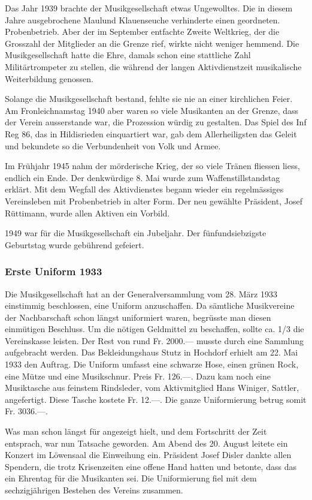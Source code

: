 \begin{history}
    Das Jahr 1939 brachte der Musikgesellschaft etwas Ungewolltes. Die in diesem
    Jahre ausgebrochene Maulund Klauenseuche verhinderte einen geordneten.
    Probenbetrieb. Aber der im September entfachte Zweite Weltkrieg, der die
    Grosszahl der Mitglieder an die Grenze rief, wirkte nicht weniger hemmend.
    Die Musikgesellschaft hatte die Ehre, damals schon eine stattliche Zahl
    Militärtrompeter zu stellen, die während der langen Aktivdienstzeit
    musikalische Weiterbildung genossen.

    Solange die Musikgesellschaft bestand, fehlte sie nie an einer kirchlichen
    Feier. Am Fronleichnamstag 1940 aber waren so viele Musikanten an der
    Grenze, dass der Verein ausserstande war, die Prozession würdig zu
    gestalten. Das Spiel des Inf Reg 86, das in Hildisrieden einquartiert war,
    gab dem Allerheiligsten das Geleit und bekundete so die Verbundenheit von
    Volk und Armee.

    Im Frühjahr 1945 nahm der mörderische Krieg, der so viele Tränen fliessen
    liess, endlich ein Ende. Der denkwürdige 8. Mai wurde zum
    Waffenstillstandstag erklärt. Mit dem Wegfall des Aktivdienstes begann
    wieder ein regelmässiges Vereinsleben mit Probenbetrieb in alter Form. Der
    neu gewählte Präsident, Josef Rüttimann, wurde allen Aktiven ein Vorbild.

    1949 war für die Musikgesellschaft ein Jubeljahr. Der fünfundsiebzigste
    Geburtstag wurde gebührend gefeiert.

    \subsubsection*{Erste Uniform 1933}

    Die Musikgesellschaft hat an der Generalversammlung vom 28. März 1933
    einstimmig beschlossen, eine Uniform anzuschaffen. Da sämtliche Musikvereine
    der Nachbarschaft schon längst uniformiert waren, begrüsste man diesen
    einmütigen Beschluss. Um die nötigen Geldmittel zu beschaffen, sollte ca.
    1/3 die Vereinskasse leisten. Der Rest von rund Fr. 2000.— musste durch eine
    Sammlung aufgebracht werden. Das Bekleidungshaus Stutz in Hochdorf erhielt
    am 22. Mai 1933 den Auftrag. Die Uniform umfasst eine schwarze Hose, einen
    grünen Rock, eine Mütze und eine Musikschnur. Preis Fr. 126.—. Dazu kam noch
    eine Musiktasche aus feinstem Rindsleder, vom Aktivmitglied Hans Winiger,
    Sattler, angefertigt. Diese Tasche kostete Fr. 12.—. Die ganze Uniformierung
    betrug somit Fr. 3036.—.

    Was man schon längst für angezeigt hielt, und dem Fortschritt der Zeit
    entsprach, war nun Tatsache geworden. Am Abend des 20. August leitete ein
    Konzert im Löwensaal die Einweihung ein. Präsident Josef Disler dankte allen
    Spendern, die trotz Krisenzeiten eine offene Hand hatten und betonte, dass
    das ein Ehrentag für die Musikanten sei. Die Uniformierung fiel mit dem
    sechzigjährigen Bestehen des Vereins zusammen.

\end{history}


